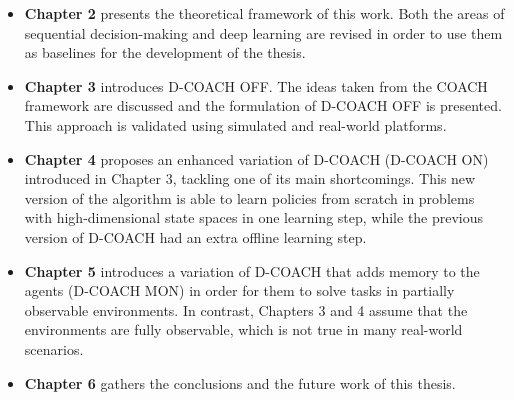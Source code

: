 \begin{itemize}
    \item \textbf{Chapter 2} presents the theoretical framework of this work. Both the areas of sequential decision-making and deep learning are revised in order to use them as baselines for the development of the thesis.
    \item \textbf{Chapter 3} introduces D-COACH OFF. The ideas taken from the COACH framework are discussed and the formulation of D-COACH OFF is presented. This approach is validated using simulated and real-world platforms.
    \item \textbf{Chapter 4} proposes an enhanced variation of D-COACH (D-COACH ON) introduced in Chapter 3, tackling one of its main shortcomings. This new version of the algorithm is able to learn policies from scratch in problems with high-dimensional state spaces in one learning step, while the previous version of D-COACH had an extra offline learning step.
    \item \textbf{Chapter 5} introduces a variation of D-COACH that adds memory to the agents (D-COACH MON) in order for them to solve tasks in partially observable environments. In contrast, Chapters 3 and 4 assume that the environments are fully observable, which is not true in many real-world scenarios.
    \item \textbf{Chapter 6} gathers the conclusions and the future work of this thesis.
\end{itemize}